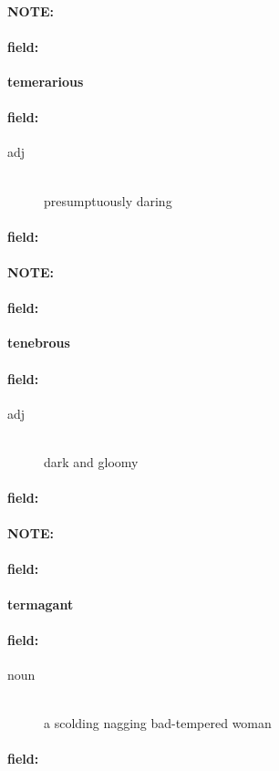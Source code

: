\documentclass[12pt]{article}
\newenvironment{note}{\paragraph{NOTE:}}{}
\newenvironment{field}{\paragraph{field:}}{}
\begin{document}
\begin{note}
\begin{field}
\textbf{\large temerarious}
\end{field}


\begin{field}
\begin{description}
\item[adj] \hfill \\ 
presumptuously daring

\end{description}
\end{field}

\begin{field}
\end{field}
\end{note}
\begin{note}
\begin{field}
\textbf{\large tenebrous}
\end{field}


\begin{field}
\begin{description}
\item[adj] \hfill \\ 
dark and gloomy

\end{description}
\end{field}

\begin{field}
\end{field}
\end{note}
\begin{note}
\begin{field}
\textbf{\large termagant}
\end{field}


\begin{field}
\begin{description}
\item[noun] \hfill \\ 
a scolding nagging bad-tempered woman

\end{description}
\end{field}

\begin{field}
\end{field}
\end{note}
\end{document}
